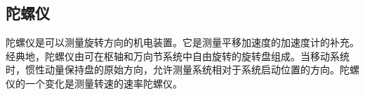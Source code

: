 


\subsection{陀螺仪}
陀螺仪是可以测量旋转方向的机电装置。它是测量平移加速度的加速度计的补充。经典地，陀螺仪由可在枢轴和万向节系统中自由旋转的旋转盘组成。当移动系统时，惯性动量保持盘的原始方向，允许测量系统相对于系统启动位置的方向。陀螺仪的一个变化是测量转速的速率陀螺仪。

